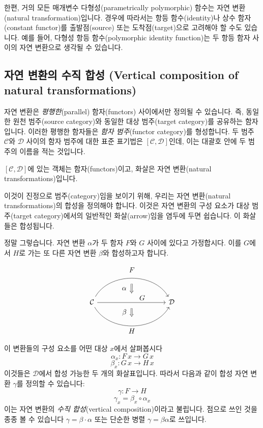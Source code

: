 \documentclass[DaoFP]{subfiles}
\begin{document}
한편, 거의 모든 매개변수 다형성(parametrically polymorphic) 함수는 자연 변환(natural transformation)입니다. 경우에 따라서는 항등 함수(identity)나 상수 함자(constant functor)를 출발점(source) 또는 도착점(target)으로 고려해야 할 수도 있습니다. 예를 들어, 다형성 항등 함수(polymorphic identity function)는 두 항등 함자 사이의 자연 변환으로 생각될 수 있습니다.

\subsection{자연 변환의 수직 합성 (Vertical composition of natural transformations)}

자연 변환은 \emph{평행한}(parallel) 함자(functors) 사이에서만 정의될 수 있습니다. 즉, 동일한 원천 범주(source category)와 동일한 대상 범주(target category)를 공유하는 함자입니다. 이러한 평행한 함자들은 \emph{함자 범주}(functor category)를 형성합니다. 두 범주 $\mathcal{C}$와 $\mathcal{D}$ 사이의 함자 범주에 대한 표준 표기법은 $[\mathcal{C}, \mathcal{D}]$인데, 이는 대괄호 안에 두 범주의 이름을 적는 것입니다.

$[\mathcal{C}, \mathcal{D}]$에 있는 객체는 함자(functors)이고, 화살은 자연 변환(natural transformations)입니다.

이것이 진정으로 범주(category)임을 보이기 위해, 우리는 자연 변환(natural transformations)의 합성을 정의해야 합니다. 이것은 자연 변환의 구성 요소가 대상 범주(target category)에서의 일반적인 화살(arrow)임을 염두에 두면 쉽습니다. 이 화살들은 합성됩니다.

정말 그렇습니다. 자연 변환 $\alpha$가 두 함자 $F$와 $G$ 사이에 있다고 가정합시다. 이를 $G$에서 $H$로 가는 또 다른 자연 변환 $\beta$와 합성하고자 합니다.

\[
\begin{tikzcd}[column sep=huge]
\mathcal{C}
  \arrow[bend left=60]{rr}[name=U, label=above:$F$]{}
  \arrow[]{rr}[name=M, label={[xshift=15pt, yshift=-5pt]:$G$}]{} 
  \arrow[bend right=60]{rr}[name=D, label=below:$H$]{} 
 &&
\mathcal{D}
  \arrow[shorten <=8pt, shorten >=8pt,Rightarrow, to path={(U) -- node[label=left:$\alpha$] {} (M)}]{}
  \arrow[shorten <=8pt, shorten >=8pt,Rightarrow, to path={(M) -- node[label=left:$\beta$] {} (D)}]{}
\end{tikzcd}
\]


이 변환들의 구성 요소를 어떤 대상 $x$에서 살펴봅시다
\[ \alpha_x \colon F \, x \to G \, x \]
\[ \beta_x \colon G \, x \to H \, x \]
이것들은 $\mathcal{D}$에서 합성 가능한 두 개의 화살표입니다. 따라서 다음과 같이 합성 자연 변환 $\gamma$를 정의할 수 있습니다:
\[ \gamma \colon F \to H\]
\[ \gamma_x = \beta_x \circ \alpha_x \]
이는 자연 변환의 \emph{수직 합성}(vertical composition)이라고 불립니다. 점으로 쓰인 것을 종종 볼 수 있습니다 $\gamma = \beta \cdot \alpha$ 또는 단순한 병렬 $\gamma = \beta \alpha$로 쓰입니다.
 
\end{document}
